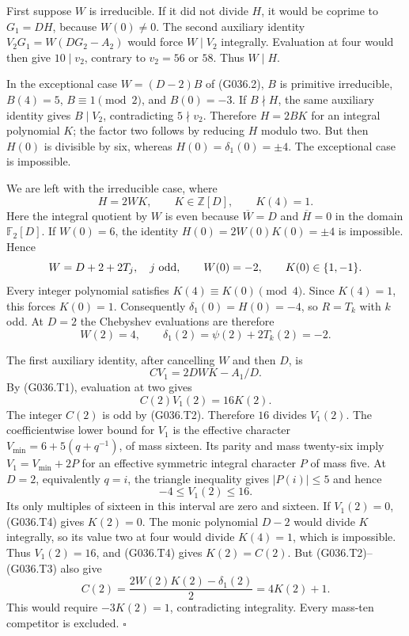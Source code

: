 First suppose $W$ is irreducible. If it did not divide
$H$, it would be coprime to $G_1=DH$, because $W(0)\ne0$.
The second auxiliary identity
$V_2G_1=W(DG_2-A_2)$ would force $W\mid V_2$ integrally.
Evaluation at four would then give $10\mid v_2$, contrary
to $v_2=56$ or $58$. Thus $W\mid H$.

In the exceptional case $W=(D-2)B$ of (G036.2),
$B$ is primitive irreducible, $B(4)=5$,
$B\equiv1\pmod2$, and $B(0)=-3$.
If $B\nmid H$, the same auxiliary identity gives
$B\mid V_2$, contradicting $5\nmid v_2$.
Therefore $H=2BK$ for an integral polynomial $K$;
the factor two follows by reducing $H$ modulo two.
But then $H(0)$ is divisible by six, whereas
$H(0)=\delta_1(0)=\pm4$. The exceptional case is impossible.

We are left with the irreducible case, where
\[
 H=2WK,\qquad K\in\mathbb Z[D],\qquad K(4)=1.
\]
Here the integral quotient by $W$ is even because
$\overline W=D$ and $\overline H=0$ in the domain
$\mathbb F_2[D]$. If $W(0)=6$, the identity
$H(0)=2W(0)K(0)=\pm4$ is impossible. Hence
\[
 W=D+2+2T_j,\quad j\ {\rm odd},\qquad W(0)=-2,
 \qquad K(0)\in\{1,-1\}.
\]
Every integer polynomial satisfies $K(4)\equiv K(0)\pmod4$.
Since $K(4)=1$, this forces $K(0)=1$.
Consequently $\delta_1(0)=H(0)=-4$, so
$R=T_k$ with $k$ odd. At $D=2$ the Chebyshev
evaluations are therefore
\[
 W(2)=4,\qquad \delta_1(2)=\psi(2)+2T_k(2)=-2.
                                                                  \tag{G036.T3}
\]

The first auxiliary identity, after cancelling $W$
and then $D$, is
\[
 C V_1=2DWK-A_1/D.
\]
By (G036.T1), evaluation at two gives
\[
                  C(2)V_1(2)=16K(2).               \tag{G036.T4}
\]
The integer $C(2)$ is odd by (G036.T2).
Therefore $16$ divides $V_1(2)$.
The coefficientwise lower bound for $V_1$ is the
effective character $V_{\min}=6+5(q+q^{-1})$,
of mass sixteen. Its parity and mass twenty-six imply
$V_1=V_{\min}+2P$ for an effective symmetric integral
character $P$ of mass five. At $D=2$, equivalently
$q=i$, the triangle inequality gives
$|P(i)|\le5$ and hence
\[
                         -4\le V_1(2)\le16.
\]
Its only multiples of sixteen in this interval are
zero and sixteen.
If $V_1(2)=0$, (G036.T4) gives $K(2)=0$.
The monic polynomial $D-2$ would divide $K$ integrally,
so its value two at four would divide $K(4)=1$,
which is impossible.
Thus $V_1(2)=16$, and (G036.T4) gives $K(2)=C(2)$.
But (G036.T2)--(G036.T3) also give
\[
 C(2)=\frac{2W(2)K(2)-\delta_1(2)}2
      =4K(2)+1.
\]
This would require $-3K(2)=1$, contradicting integrality.
Every mass-ten competitor is excluded.
\hfill$\square$

